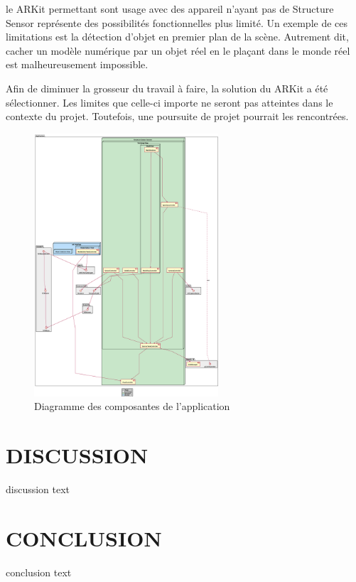 \documentclass[letterpaper,twoside,12pt,french]{report}
\begin{document}
le ARKit permettant sont usage avec des appareil n'ayant pas de Structure Sensor représente des
possibilités fonctionnelles plus limité. Un exemple de ces limitations est la détection d'objet
en premier plan de la scène. Autrement dit, cacher un modèle numérique par un objet réel en le
plaçant dans le monde réel est malheureusement impossible.
\par
Afin de diminuer la grosseur du travail à faire, la solution du ARKit a été sélectionner. Les
limites que celle-ci importe ne seront pas atteintes dans le contexte du projet. Toutefois, une
poursuite de projet pourrait les rencontrées.
\begin{figure}[H]
    \includegraphics[width=0.61\textwidth]{project-architecture.eps}
\centering
    \caption{Diagramme des composantes de l'application}
\end{figure}
\chapter*{\uppercase{Discussion}}
discussion text
\chapter*{\uppercase{Conclusion}}
conclusion text
\newpage
\begin{spacing}{1}
    \nocite{*}
    

    
\end{spacing}
\end{document}
